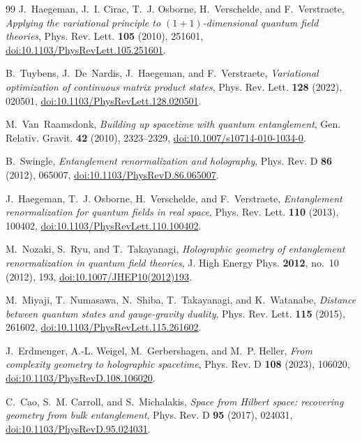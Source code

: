 \documentclass[11pt,a4paper,reqno]{amsart}
\theoremstyle{definition}
\numberwithin{equation}{section}
\begin{document}
\begin{thebibliography}{99}
J.~Haegeman, J.~I. Cirac, T.~J. Osborne, H.~Verschelde, and F.~Verstraete,
\emph{Applying the variational principle to $(1+1)$-dimensional quantum field theories},
Phys. Rev. Lett. \textbf{105} (2010), 251601,
\href{https://doi.org/10.1103/PhysRevLett.105.251601}{doi:10.1103/PhysRevLett.105.251601}.

B.~Tuybens, J.~De~Nardis, J.~Haegeman, and F.~Verstraete,
\emph{Variational optimization of continuous matrix product states},
Phys. Rev. Lett. \textbf{128} (2022), 020501,
\href{https://doi.org/10.1103/PhysRevLett.128.020501}{doi:10.1103/PhysRevLett.128.020501}.

M.~Van~Raamsdonk,
\emph{Building up spacetime with quantum entanglement},
Gen. Relativ. Gravit. \textbf{42} (2010), 2323--2329,
\href{https://doi.org/10.1007/s10714-010-1034-0}{doi:10.1007/s10714-010-1034-0}.

B.~Swingle,
\emph{Entanglement renormalization and holography},
Phys. Rev. D \textbf{86} (2012), 065007,
\href{https://doi.org/10.1103/PhysRevD.86.065007}{doi:10.1103/PhysRevD.86.065007}.

J.~Haegeman, T.~J. Osborne, H.~Verschelde, and F.~Verstraete,
\emph{Entanglement renormalization for quantum fields in real space},
Phys. Rev. Lett. \textbf{110} (2013), 100402,
\href{https://doi.org/10.1103/PhysRevLett.110.100402}{doi:10.1103/PhysRevLett.110.100402}.

M.~Nozaki, S.~Ryu, and T.~Takayanagi,
\emph{Holographic geometry of entanglement renormalization in quantum field theories},
J. High Energy Phys. \textbf{2012}, no.~10 (2012), 193,
\href{https://doi.org/10.1007/JHEP10(2012)193}{doi:10.1007/JHEP10(2012)193}.

M.~Miyaji, T.~Numasawa, N.~Shiba, T.~Takayanagi, and K.~Watanabe,
\emph{Distance between quantum states and gauge-gravity duality},
Phys. Rev. Lett. \textbf{115} (2015), 261602,
\href{https://doi.org/10.1103/PhysRevLett.115.261602}{doi:10.1103/PhysRevLett.115.261602}.

J.~Erdmenger, A.-L. Weigel, M.~Gerbershagen, and M.~P. Heller,
\emph{From complexity geometry to holographic spacetime},
Phys. Rev. D \textbf{108} (2023), 106020,
\href{https://doi.org/10.1103/PhysRevD.108.106020}{doi:10.1103/PhysRevD.108.106020}.

C.~Cao, S.~M. Carroll, and S.~Michalakis,
\emph{Space from Hilbert space: recovering geometry from bulk entanglement},
Phys. Rev. D \textbf{95} (2017), 024031,
\href{https://doi.org/10.1103/PhysRevD.95.024031}{doi:10.1103/PhysRevD.95.024031}.


\end{thebibliography}
\end{document}
